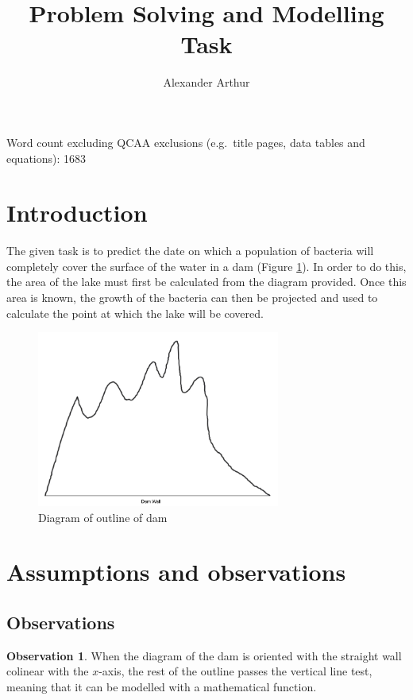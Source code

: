 \documentclass[a4paper]{article}
\title{Problem Solving and Modelling Task}
\author{Alexander Arthur}
\theoremstyle{definition}
\newtheorem{observation}{Observation}
\begin{document}
\maketitle
\setcounter{tocdepth}{1}
\tableofcontents

\vfill

Word count excluding QCAA exclusions (e.g.\ title pages, data tables and equations): 1683

\newpage

\section{Introduction}
    The given task is to predict the date on which a population of bacteria will completely cover the surface of the water in a dam (Figure \ref{figDamOutline}). In order to do this, the area of the lake must first be calculated from the diagram provided. Once this area is known, the growth of the bacteria can then be projected and used to calculate the point at which the lake will be covered.

    \begin{figure} %
        \centering
        \includegraphics[width = 8cm]{damDiagram.png}
        \caption{Diagram of outline of dam}
        \label{figDamOutline}
    \end{figure}



\section{Assumptions and observations}

    \subsection{Observations}

        \begin{observation}
            When the diagram of the dam is oriented with the straight wall colinear with the $x$-axis, the rest of the outline passes the vertical line test, meaning that it can be modelled with a mathematical function.
        \end{observation}
\end{document}
